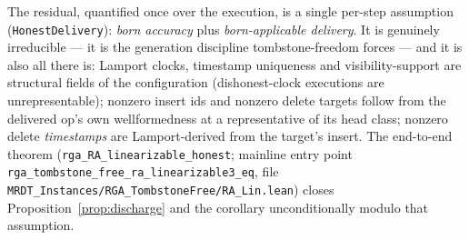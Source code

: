 \documentclass[11pt]{article}
\newcommand{\lean}[1]{\texttt{#1}}
\begin{document}
The residual, quantified once over the execution, is a single per-step assumption
(\lean{HonestDelivery}): \emph{born accuracy} plus \emph{born-applicable delivery}. It is
genuinely irreducible --- it is the generation discipline tombstone-freedom forces --- and it
is also all there is: Lamport clocks, timestamp uniqueness and visibility-support are
structural fields of the configuration (dishonest-clock executions are unrepresentable);
nonzero insert ids and nonzero delete targets follow from the delivered op's own
wellformedness at a representative of its head class; nonzero delete \emph{timestamps} are
Lamport-derived from the target's insert. The end-to-end theorem
(\lean{rga\_RA\_linearizable\_honest}; mainline entry point
\lean{rga\_tombstone\_free\_ra\_linea\-rizable3\_eq},
file \lean{MRDT\_Instances/RGA\_TombstoneFree/RA\_Lin.lean}) closes
Proposition~\ref{prop:discharge} and the corollary unconditionally modulo
that assumption.
\end{document}
